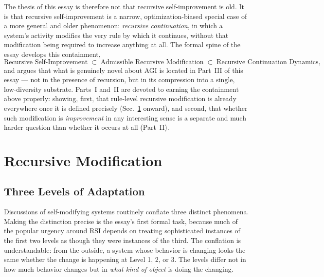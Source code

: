 \documentclass[12pt,a4paper]{article}
\theoremstyle{plain}
\theoremstyle{definition}
\theoremstyle{remark}
\begin{document}
The thesis of this essay is therefore not that recursive self-improvement is old. It is that recursive self-improvement is a narrow, optimization-biased special case of a more general and older phenomenon: \emph{recursive continuation}, in which a system's activity modifies the very rule by which it continues, without that modification being required to increase anything at all. The formal spine of the essay develops this containment,
\[
\text{Recursive Self-Improvement} \;\subset\; \text{Admissible Recursive Modification} \;\subset\; \text{Recursive Continuation Dynamics},
\]
and argues that what is genuinely novel about AGI is located in Part~III of this essay — not in the presence of recursion, but in its compression into a single, low-diversity substrate. Parts~I and~II are devoted to earning the containment above properly: showing, first, that rule-level recursive modification is already everywhere once it is defined precisely (Sec.~\ref{sec:recursive-modification} onward), and second, that whether such modification is \emph{improvement} in any interesting sense is a separate and much harder question than whether it occurs at all (Part~II).

\section{Recursive Modification}
\label{sec:recursive-modification}

\subsection{Three Levels of Adaptation}
\label{subsec:three-levels}

Discussions of self-modifying systems routinely conflate three distinct phenomena. Making the distinction precise is the essay's first formal task, because much of the popular urgency around RSI depends on treating sophisticated instances of the first two levels as though they were instances of the third. The conflation is understandable: from the outside, a system whose behavior is changing looks the same whether the change is happening at Level 1, 2, or 3. The levels differ not in how much behavior changes but in \emph{what kind of object} is doing the changing.
\end{document}
